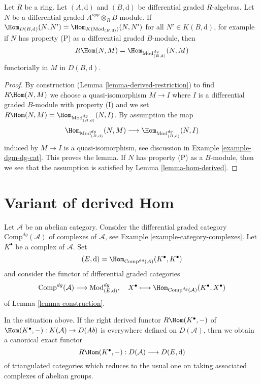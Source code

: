 \begin{lemma}
\label{lemma-compute-derived-restriction}
Let $R$ be a ring. Let $(A, \text{d})$ and $(B, \text{d})$ be
differential graded $R$-algebras. Let $N$ be a differential
graded $A^{opp} \otimes_R B$-module. If
$\Hom_{D(B, \text{d})}(N, N') = \Hom_{K(\text{Mod}_{(B, \text{d})})}(N, N')$
for all $N' \in K(B, \text{d})$, for example if $N$
has property (P) as a differential graded $B$-module, then
$$
R\Hom(N, M) = \Hom_{\text{Mod}^{dg}_{(B, \text{d})}}(N, M)
$$
functorially in $M$ in $D(B, \text{d})$.
\end{lemma}

\begin{proof}
By construction (Lemma \ref{lemma-derived-restriction})
to find $R\Hom(N, M)$ we choose a quasi-isomorphism
$M \to I$ where $I$ is a differential graded $B$-module
with property (I) and we set
$R\Hom(N, M) = \Hom_{\text{Mod}^{dg}_{(B, \text{d})}}(N, I)$.
By assumption the map
$$
\Hom_{\text{Mod}^{dg}_{(B, \text{d})}}(N, M) \longrightarrow
\Hom_{\text{Mod}^{dg}_{(B, \text{d})}}(N, I)
$$
induced by $M \to I$ is a quasi-isomorphism, see discussion in
Example \ref{example-dgm-dg-cat}. This proves the lemma.
If $N$ has property (P) as a $B$-module, then we see that the
assumption is satisfied by Lemma \ref{lemma-hom-derived}.
\end{proof}




\section{Variant of derived Hom}
\label{section-variant}

\noindent
Let $\mathcal{A}$ be an abelian category. Consider the differential graded
category $\text{Comp}^{dg}(\mathcal{A})$ of complexes of $\mathcal{A}$, see
Example \ref{example-category-complexes}.
Let $K^\bullet$ be a complex of $\mathcal{A}$. Set
$$
(E, \text{d}) = \Hom_{\text{Comp}^{dg}(\mathcal{A})}(K^\bullet, K^\bullet)
$$
and consider the functor of differential graded categories
$$
\text{Comp}^{dg}(\mathcal{A}) \longrightarrow \text{Mod}^{dg}_{(E, \text{d})},
\quad
X^\bullet
\longmapsto
\Hom_{\text{Comp}^{dg}(\mathcal{A})}(K^\bullet, X^\bullet)
$$
of Lemma \ref{lemma-construction}.

\begin{lemma}
\label{lemma-existence-of-derived}
In the situation above. If the right derived functor $R\Hom(K^\bullet, -)$
of $\Hom(K^\bullet, -) : K(\mathcal{A}) \to D(\textit{Ab})$
is everywhere defined on $D(\mathcal{A})$, then we obtain a canonical exact
functor
$$
R\Hom(K^\bullet, -) : D(\mathcal{A}) \longrightarrow D(E, \text{d})
$$
of triangulated categories which reduces to the usual one  on taking
associated complexes of abelian groups.
\end{lemma}

